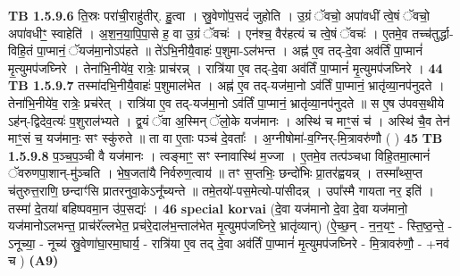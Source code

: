 \documentclass[17pt]{extarticle}
\begin{document}
                  \newline
                                \textbf{ TB 1.5.9.6} \newline
                  ति॒स्रः परा॑ची॒राहु॑तीर्. हु॒त्वा । स्रु॒वेणो॑प॒सदं॑ जुहोति । उ॒ग्रं ॅवचो॒ अपा॑वधीं त्वे॒षं ॅवचो॒ अपा॑वधीꣳ॒॒ स्वाहेति॑ । अ॒श॒न॒या॒पि॒पा॒से ह॒ वा उ॒ग्रं ॅवचः॑ । एन॑श्च॒ वैर॑हत्यं च त्वे॒षं ॅवचः॑ । ए॒तमे॒व तच्च॑तुर्द्धा-विहि॒तं पा॒प्मानं॒ ॅयज॑मा॒नोऽप॑हते ॥ ते॑ऽभि॒नीयै॒वाहः॑ प॒शुमा-ऽल॑भन्त । अह्न॑ ए॒व तद्-दे॒वा अव॑र्तिं पा॒प्मानं॑ मृ॒त्युमप॑जघ्निरे । तेना॑भि॒नीये॑व॒ रात्रेः॒ प्राच॑रन्न् । रात्रि॑या ए॒व तद्-दे॒वा अव॑र्तिं पा॒प्मानं॑ मृ॒त्युमप॑जघ्निरे । \textbf{ 44} \newline
                  \newline
                                \textbf{ TB 1.5.9.7} \newline
                  तस्मा॑दभि॒नीयै॒वाहः॑ प॒शुमाल॑भेत । अह्न॑ ए॒व तद्-यज॑मा॒नो ऽव॑र्तिं पा॒प्मानं॒ भ्रातृ॑व्या॒नप॑नुदते । तेना॑भि॒नीये॑व॒ रात्रेः॒ प्रच॑रेत् । रात्रि॑या ए॒व तद्-यज॑मा॒नो ऽव॑र्तिं पा॒प्मानं॒ भ्रातृ॑व्या॒नप॑नुदते ॥ स ए॒ष उ॑पवस॒थीये ऽह॑न्-द्विदेव॒त्यः॑ प॒शुराल॑भ्यते । द्व॒यं ॅवा अ॒स्मिन् ॅलो॒के यज॑मानः । अस्थि॑ च माꣳ॒॒सं च॑ । अस्थि॑ चै॒व तेन॑ माꣳ॒॒सं च॒ यज॑मानः॒ सꣳ स्कु॑रुते ॥ ता वा ए॒ताः पञ्च॑ दे॒वताः᳚ । अ॒ग्नीषोमा॑-व॒ग्निर्-मि॒त्रावरु॑णौ ( ) \textbf{ 45} \newline
                  \newline
                                \textbf{ TB 1.5.9.8} \newline
                  प॒ञ्च॒प॒ञ्ची वै यज॑मानः । त्वङ्माꣳ॒॒ सꣳ स्नावास्थि॑ म॒ज्जा । ए॒तमे॒व तत्प॑ञ्चधा विहि॒तमा॒त्मानं॑ ॅवरुणपा॒शान्-मु॑ञ्चति । भे॒ष॒जता॑यै निर्वरुण॒त्वाय॑ ॥ तꣳ स॒प्तभिः॒ छन्दो॑भिः प्रा॒तर॑ह्वयन्न् । तस्मा᳚थ्स॒प्त च॑तुरुत्त॒राणि॒ छन्दाꣳ॑सि प्रातरनुवा॒केऽनू᳚च्यन्ते ॥ तमे॒तयो॑-पस॒मेत्यो-पा॑सीदन्न् । उपा᳚स्मै गायता नर॒ इति॑ । तस्मा॑ दे॒तया॑ बहिष्पवमा॒न उ॑प॒सद्यः॑ । \textbf{ 46} \newline
                  \newline
                                                        \textbf{special korvai} \newline
              (दे॒वा यज॑मानो दे॒वा दे॒वा यज॑मानो॒ यज॑मानोऽलभन्त॒ प्राच॑रॅल्लभेत॒ प्रच॑रे॒दाल॑भ॒न्ताल॑भेत मृ॒त्युमप॑जघ्निरे॒ भ्रातृ॑व्यान्) \newline
                                (ऐ॒च्छ॒न् - न॒न॒यꣳ॒॒ - स्ति॒ष्ठ॒न्ते॒ - ऽनूच्या॒ - नूच्य॑ स्रु॒वेणा॑घा॒रमा॒घार्य॒ - रात्रि॑या ए॒व तद् दे॒वा अव॑र्तिं पा॒प्मानं॑ मृ॒त्युमप॑जघ्निरे - मि॒त्रावरु॑णौ॒ - +नव॑ च ) \textbf{(A9)} \newline \newline
\end{document}
